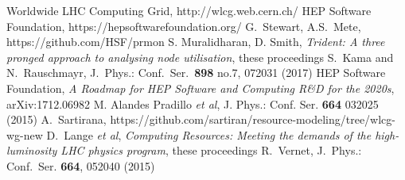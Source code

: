 \begin{thebibliography}{}
Worldwide LHC Computing Grid, http://wlcg.web.cern.ch/
HEP Software Foundation, https://hepsoftwarefoundation.org/
G.~Stewart, A.S.~Mete, https://github.com/HSF/prmon
S. Muralidharan, D. Smith, \textit{Trident: A three pronged approach to analysing node utilisation}, these proceedings
S.~Kama and N.~Rauschmayr, J.\ Phys.: Conf.\ Ser.\ {\bf 898} no.7, 072031 (2017)
HEP Software Foundation, \textit{A Roadmap for HEP Software and Computing R\&D for the 2020s}, arXiv:1712.06982
M. Alandes Pradillo {\em et al}, J. Phys.: Conf. Ser. \textbf{664} 032025 (2015)
A.~Sartirana, https://github.com/sartiran/resource-modeling/tree/wlcg-wg-new
D.~Lange {\em et al}, \textit{Computing Resources: Meeting the demands of the high-luminosity LHC physics program}, these proceedings
R.~Vernet, J.\ Phys.: Conf.\ Ser. \textbf{664}, 052040 (2015)
\end{thebibliography}

